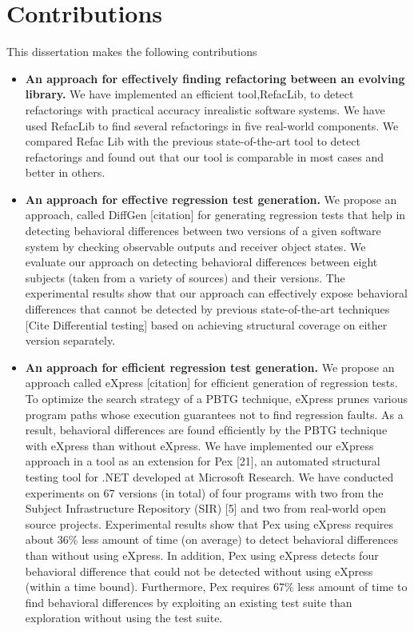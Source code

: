 \section{Contributions}
This dissertation makes the following contributions

\begin{itemize}
\item \textbf{An approach for effectively finding refactoring between an evolving library.} 
We have implemented an efficient tool,RefacLib, to detect refactorings with practical accuracy inrealistic software systems.
We have used RefacLib to ﬁnd several refactorings in ﬁve real-world components. We compared Refac
Lib with the previous state-of-the-art tool to detect refactorings and found out that our tool is comparable in most cases
and better in others.

\item \textbf{An approach for effective regression test generation.} 
We propose an approach, called DiffGen [citation] for generating regression tests that help in detecting behavioral differences between two versions of a given software system by checking 
observable outputs and receiver object states. We evaluate our approach on detecting behavioral differences between eight subjects (taken from a variety of sources) and their versions. The experimental results show that our approach can effectively expose behavioral differences that cannot be detected by previous state-of-the-art techniques [Cite Differential testing] based on achieving structural coverage on either version separately.

\item \textbf{An approach for efficient regression test generation.}
We propose an approach called eXpress [citation] for efﬁcient generation of regression tests. To optimize the search strategy of a PBTG technique, eXpress prunes various program paths whose execution guarantees not to find regression faults. As a result, behavioral differences are found efﬁciently by the PBTG technique with eXpress than without eXpress. We have implemented our eXpress approach in a tool as an extension for Pex [21], an automated structural testing tool for .NET developed at Microsoft Research. We have conducted experiments on 67 versions (in
total) of four programs with two from the Subject Infrastructure
Repository (SIR) [5] and two from real-world open source projects.
Experimental results show that Pex using eXpress requires about
36\% less amount of time (on average) to detect behavioral differences than without using eXpress. In addition, Pex using eXpress
detects four behavioral difference that could not be detected without using eXpress (within a time bound). Furthermore, Pex requires
67\% less amount of time to ﬁnd behavioral differences by exploiting an existing test suite than exploration without using the test
suite.


\end{itemize}
